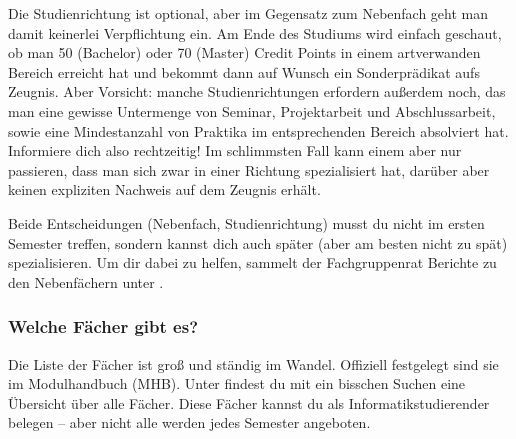 	Die Studienrichtung ist  optional, aber im Gegensatz zum Nebenfach geht man damit keinerlei Verpflichtung ein. Am Ende des Studiums wird einfach geschaut, ob man 50 (Bachelor) oder 70 (Master) Credit Points in einem artverwanden Bereich erreicht hat und bekommt dann auf Wunsch ein Sonderprädikat aufs Zeugnis. Aber Vorsicht: manche Studienrichtungen erfordern außerdem noch, das man eine gewisse Untermenge von Seminar, Projektarbeit und Abschlussarbeit, sowie eine Mindestanzahl von Praktika im entsprechenden Bereich absolviert hat. Informiere dich also rechtzeitig! Im schlimmsten Fall kann einem aber nur passieren, dass man sich zwar in einer Richtung spezialisiert hat, darüber aber keinen expliziten Nachweis auf dem Zeugnis erhält.

	Beide Entscheidungen (Nebenfach, Studienrichtung) musst du nicht im ersten Semester treffen, sondern kannst dich auch später (aber am besten nicht zu spät) spezialisieren. Um dir dabei zu helfen, sammelt der Fachgruppenrat Berichte zu den Nebenfächern unter .

\subsubsection{Welche Fächer gibt es?}
	Die Liste der Fächer ist groß und ständig im Wandel. Offiziell festgelegt sind sie im Modulhandbuch (MHB). Unter  findest du mit ein bisschen Suchen eine Übersicht über alle Fächer. Diese Fächer kannst du als Informatikstudierender belegen -- aber nicht alle werden jedes Semester angeboten.

%

